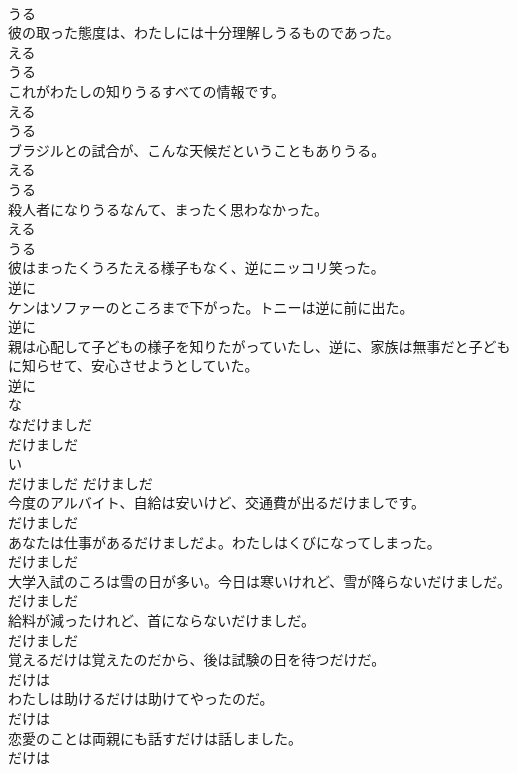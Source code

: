\documentclass[8pt]{extreport}
\begin{document}
\begin{CJK}{UTF8}{min}
\\	うる
\\	彼の取った態度は、わたしには十分理解しうるものであった。	
\\	える 
\\	うる
\\	これがわたしの知りうるすべての情報です。	
\\	える 
\\	うる
\\	ブラジルとの試合が、こんな天候だということもありうる。	
\\	える 
\\	うる
\\	殺人者になりうるなんて、まったく思わなかった。	
\\	える 
\\	うる
\\	彼はまったくうろたえる様子もなく、逆にニッコリ笑った。	
\\	逆に
\\	ケンはソファーのところまで下がった。トニーは逆に前に出た。	
\\	逆に
\\	親は心配して子どもの様子を知りたがっていたし、逆に、家族は無事だと子どもに知らせて、安心させようとしていた。	
\\	逆に
\\	な
\\	なだけましだ	
\\	だけましだ	
\\	い
\\	だけましだ	だけましだ
\\	今度のアルバイト、自給は安いけど、交通費が出るだけましです。	
\\	だけましだ
\\	あなたは仕事があるだけましだよ。わたしはくびになってしまった。	
\\	だけましだ
\\	大学入試のころは雪の日が多い。今日は寒いけれど、雪が降らないだけましだ。	
\\	だけましだ
\\	給料が減ったけれど、首にならないだけましだ。	
\\	だけましだ
\\	覚えるだけは覚えたのだから、後は試験の日を待つだけだ。	
\\	だけは
\\	わたしは助けるだけは助けてやったのだ。	
\\	だけは
\\	恋愛のことは両親にも話すだけは話しました。	
\\	だけは

\end{CJK}
\end{document}
